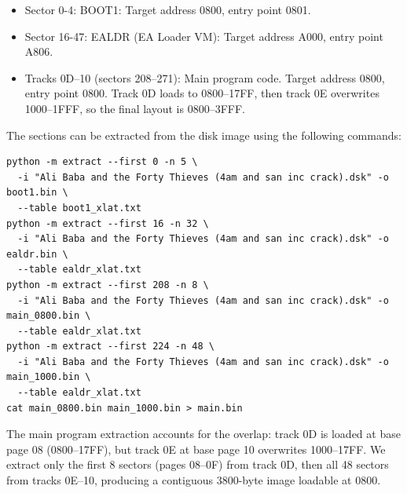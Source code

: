 \documentclass[10pt]{report}
\begin{document}
\begin{itemize}
  \item Sector 0-4: {\Tt{}BOOT1\nwendquote}:
    Target address {\Tt{}{\$}0800\nwendquote}, entry point {\Tt{}{\$}0801\nwendquote}.
  \item Sector 16-47: {\Tt{}EALDR\nwendquote} (EA Loader VM):
    Target address {\Tt{}{\$}A000\nwendquote}, entry point {\Tt{}{\$}A806\nwendquote}.
  \item Tracks {\Tt{}{\$}0D\nwendquote}--{\Tt{}{\$}10\nwendquote} (sectors 208--271): Main program code.
    Target address {\Tt{}{\$}0800\nwendquote}, entry point {\Tt{}{\$}0800\nwendquote}.
    Track {\Tt{}{\$}0D\nwendquote} loads to {\Tt{}{\$}0800\nwendquote}--{\Tt{}{\$}17FF\nwendquote}, then track {\Tt{}{\$}0E\nwendquote} overwrites
    {\Tt{}{\$}1000\nwendquote}--{\Tt{}{\$}1FFF\nwendquote}, so the final layout is {\Tt{}{\$}0800\nwendquote}--{\Tt{}{\$}3FFF\nwendquote}.
\end{itemize}

The sections can be extracted from the disk image using the following commands:

\begin{verbatim}
python -m extract --first 0 -n 5 \
  -i "Ali Baba and the Forty Thieves (4am and san inc crack).dsk" -o boot1.bin \
  --table boot1_xlat.txt
python -m extract --first 16 -n 32 \
  -i "Ali Baba and the Forty Thieves (4am and san inc crack).dsk" -o ealdr.bin \
  --table ealdr_xlat.txt
python -m extract --first 208 -n 8 \
  -i "Ali Baba and the Forty Thieves (4am and san inc crack).dsk" -o main_0800.bin \
  --table ealdr_xlat.txt
python -m extract --first 224 -n 48 \
  -i "Ali Baba and the Forty Thieves (4am and san inc crack).dsk" -o main_1000.bin \
  --table ealdr_xlat.txt
cat main_0800.bin main_1000.bin > main.bin
\end{verbatim}

The main program extraction accounts for the overlap: track {\Tt{}{\$}0D\nwendquote} is loaded
at base page {\Tt{}{\$}08\nwendquote} ({\Tt{}{\$}0800\nwendquote}--{\Tt{}{\$}17FF\nwendquote}), but track {\Tt{}{\$}0E\nwendquote} at base page
{\Tt{}{\$}10\nwendquote} overwrites {\Tt{}{\$}1000\nwendquote}--{\Tt{}{\$}17FF\nwendquote}. We extract only the first 8 sectors
(pages {\Tt{}{\$}08\nwendquote}--{\Tt{}{\$}0F\nwendquote}) from track {\Tt{}{\$}0D\nwendquote}, then all 48 sectors from tracks
{\Tt{}{\$}0E\nwendquote}--{\Tt{}{\$}10\nwendquote}, producing a contiguous {\Tt{}{\$}3800\nwendquote}-byte image loadable at {\Tt{}{\$}0800\nwendquote}.
\end{document}
